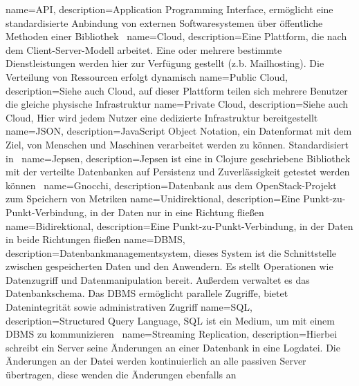 {
  name=API,
  description={Application Programming Interface, ermöglicht eine
               standardisierte Anbindung von externen Softwaresystemen über
               öffentliche Methoden einer Bibliothek~\cite{HowDoAPIsEvolve}}
}
{
  name=Cloud,
  description={Eine Plattform, die nach dem Client-Server-Modell arbeitet. Eine
               oder mehrere bestimmte Dienstleistungen werden hier zur
               Verfügung gestellt (z.b. Mailhosting). Die Verteilung von
               Ressourcen erfolgt dynamisch}
}
{
  name=Public Cloud,
  description={Siehe auch \gls{Cloud}, auf dieser Plattform teilen sich mehrere
               Benutzer die gleiche physische Infrastruktur}
}
{
  name=Private Cloud,
  description={Siehe auch \gls{Cloud}, Hier wird jedem Nutzer eine dedizierte
               Infrastruktur bereitgestellt}
}
{
  name=JSON,
  description={JavaScript Object Notation, ein Datenformat mit dem Ziel, von
               Menschen und Maschinen verarbeitet werden zu können.
               Standardisiert in~\cite{RFC7159}}
}
{
  name=Jepsen,
  description={Jepsen ist eine in Clojure geschriebene Bibliothek mit der
               verteilte Datenbanken auf Persistenz und Zuverlässigkeit
               getestet werden können~\cite{Jepsen_Introduction}}
}
{
  name=Gnocchi,
  description={Datenbank aus dem OpenStack-Projekt zum Speichern von Metriken}
}
{
  name=Unidirektional,
  description={Eine Punkt-zu-Punkt-Verbindung, in der Daten nur in eine
               Richtung fließen}
}
{
  name=Bidirektional,
  description={Eine Punkt-zu-Punkt-Verbindung, in der Daten in beide Richtungen
               fließen}
}
{
  name=DBMS,
  description={Datenbankmanagementsystem, dieses System ist die Schnittstelle
               zwischen gespeicherten Daten und den Anwendern. Es stellt
               Operationen wie Datenzugriff und Datenmanipulation bereit.
               Außerdem verwaltet es das Datenbankschema. Das DBMS ermöglicht
               parallele Zugriffe, bietet Datenintegrität sowie administrativen
               Zugriff}
}
{
  name=SQL,
  description={Structured Query Language, SQL ist ein Medium, um mit einem
               \gls{DBMS} zu kommunizieren~\cite{sumathi2007fundamentals}}
}
{
  name=Streaming Replication,
  description={Hierbei schreibt ein Server seine Änderungen an einer Datenbank
               in eine Logdatei. Die Änderungen an der Datei werden
               kontinuierlich an alle passiven Server übertragen, diese wenden
               die Änderungen ebenfalls an}
}
